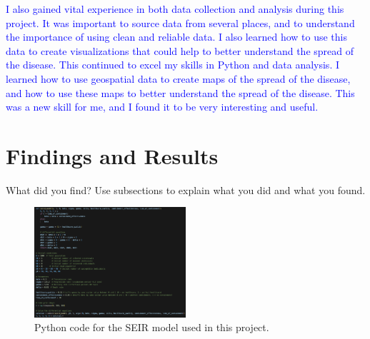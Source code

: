 \documentclass[%
 reprint,
superscriptaddress,
 amsmath,amssymb,
 aps,
]{revtex4-2}
\begin{document}
\textcolor{blue}{I also gained vital experience in both data collection and analysis during this project. It was important to source data from several places, and to understand the importance of using clean and reliable data. I also learned how to use this data to create visualizations that could help to better understand the spread of the disease. This continued to excel my skills in Python and data analysis.
I learned how to use geospatial data to create maps of the spread of the disease, and how to use these maps to better understand the spread of the disease. This was a new skill for me, and I found it to be very interesting and useful.}

\section{Findings and Results}

What did you find? Use subsections to explain what you did and what you found. 

\begin{figure}[t]
    \centering
    \includegraphics[width=0.5\textwidth]{SEIRD Model.png}
    \caption{Python code for the SEIR model used in this project.}
    \label{SEIR Model}
\end{figure}
\end{document}
